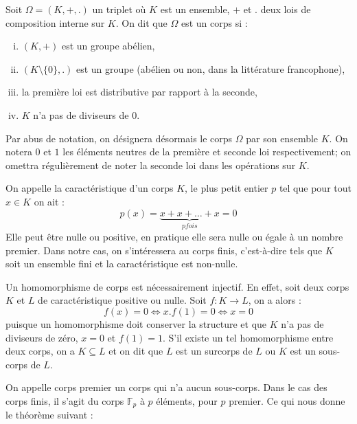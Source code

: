 \documentclass[a4paper]{article} %
\numberwithin{section}{part}
\numberwithin{equation}{section}
\newcommand\GF[1]{\mathbb{F}_{#1}}
\begin{document}
Soit $\Omega = (K, +, .)$ un triplet où $K$ est un ensemble, $+$ et $.$ deux
lois de composition interne sur $K$. On dit que $\Omega$ est un corps si : 
\begin{enumerate}[(i)]
\item $(K, +)$ est un groupe abélien,
\item $(K\setminus\lbrace0\rbrace,.)$ est un groupe (abélien ou non, dans la 
littérature francophone),
\item la première loi est distributive par rapport à la seconde,
\item $K$ n'a pas de diviseurs de $0$.
\end{enumerate}
Par abus de notation, on désignera désormais le corps $\Omega$ par son ensemble
$K$. On notera $0$ et $1$ les éléments neutres de la première et seconde loi 
respectivement; on omettra régulièrement de noter la seconde loi dans les 
opérations sur $K$.\par
On appelle la caractéristique d'un corps $K$, le plus petit entier $p$ tel que 
pour tout $x\in K$ on ait :
\[p(x) = \underbrace{x + x + \dots + x}_{p fois} = 0\]
Elle peut être nulle ou positive, en pratique elle sera nulle ou égale à un
nombre premier. Dans notre cas, on s'intéressera au corps finis, c'est-à-dire 
tels que $K$ soit un ensemble fini et la caractéristique est non-nulle.\par
\vspace{0.3cm}
Un homomorphisme de corps est nécessairement injectif. En effet, soit deux corps
$K$ et $L$ de caractéristique positive ou nulle. Soit $f : K \to L$, on a alors 
:
\[f(x) = 0 \Leftrightarrow x.f(1) = 0 \Leftrightarrow x = 0\]
puisque un homomorphisme doit conserver la structure et que $K$ n'a pas de
diviseurs de zéro, $x = 0$ et $f(1) = 1$. S'il existe un
tel homomorphisme entre deux corps, on a $K\subseteq L$ et on dit que $L$ est un
surcorps de $L$ ou $K$ est un sous-corps de $L$.\par
On appelle corps premier un corps qui n'a aucun sous-corps. Dans le cas des
corps finis, il s'agit du corps $\GF{p}$ à $p$ éléments, pour $p$ premier. Ce
qui nous donne le théorème suivant :
\end{document}
